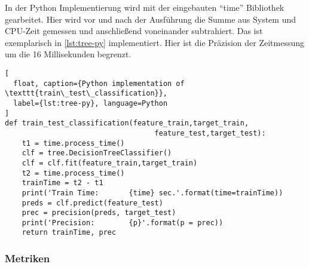 In der Python Implementierung wird mit der eingebauten \enquote{time} Bibliothek gearbeitet.
Hier wird vor und nach der Ausführung die Summe aus System und CPU-Zeit gemessen und anschließend
voneinander subtrahiert. Das ist exemplarisch in \cref{lst:tree-py} implementiert.
Hier ist die Präzision der Zeitmessung um die 16 Millisekunden begrenzt.

\begin{lstlisting}[
  float, caption={Python implementation of \texttt{train\_test\_classification}},
  label={lst:tree-py}, language=Python
]
def train_test_classification(feature_train,target_train,
                                   feature_test,target_test):
    t1 = time.process_time()
    clf = tree.DecisionTreeClassifier()
    clf = clf.fit(feature_train,target_train)
    t2 = time.process_time()
    trainTime = t2 - t1
    print('Train Time:       {time} sec.'.format(time=trainTime))
    preds = clf.predict(feature_test)
    prec = precision(preds, target_test)
    print('Precision:        {p}'.format(p = prec))
    return trainTime, prec
\end{lstlisting}

\subsubsection{Metriken}

